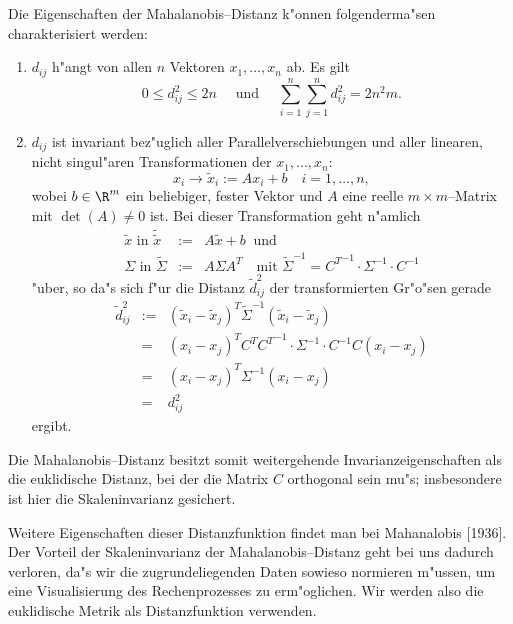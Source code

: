 Die Eigenschaften der Mahalanobis--Distanz k"onnen folgenderma"sen 
charakterisiert werden:
\begin{enumerate}
\item $d_{ij}$ h"angt von allen $n$ Vektoren $x_1,\dots,x_n$ ab. Es gilt
\[ 0 \leq d_{ij}^2 \leq 2n \quad \mbox{ und } \quad 
	\sum_{i=1}^n\sum_{j=1}^n d_{ij}^2 = 2n^2m.\]
\item $d_{ij}$ ist invariant bez"uglich aller Parallelverschiebungen
und aller linearen, nicht singul"aren Transformationen der $x_1,\dots,x_n$:
\[ x_i \to \tilde x_i := A x_i + b \quad i =1,\dots,n,\]
wobei $b \in \R^m$ ein beliebiger, fester Vektor und $A$ eine reelle
$m\times m$--Matrix mit $\det(A) \neq 0$ ist. Bei dieser
Transformation geht n"amlich
\begin{eqnarray*}
	\tilde x \mbox{ in } \tilde{\tilde x} & := & A \tilde x + b \ \mbox{ und}\\
	\Sigma   \mbox{ in } \tilde\Sigma     & := & A \Sigma A^T \quad \mbox{mit }
		\tilde\Sigma^{-1} = {C^T}^{-1} \cdot \Sigma^{-1} \cdot C^{-1}
\end{eqnarray*}
"uber, so da"s sich f"ur die Distanz $\tilde d_{ij}^2$ der transformierten
Gr"o"sen gerade
\begin{eqnarray*}
	\tilde d_{ij}^2 & := & (\tilde x_i -\tilde x_j)^T\tilde\Sigma^{-1}
		(\tilde x_i - \tilde x_j) \\
	& = & (x_i -x_j)^TC^T{C^T}^{-1}\cdot\Sigma^{-1}\cdot C^{-1}C(x_i-x_j) \\
	& = & (x_i -x_j)^T \Sigma^{-1}(x_i-x_j)\\
	& = & d^2_{ij}
\end{eqnarray*}
ergibt.
\end{enumerate}
Die Mahalanobis--Distanz besitzt somit weitergehende Invarianzeigenschaften
als die euklidische Distanz, bei der die Matrix $C$ orthogonal sein mu"s;
insbesondere ist hier die Skaleninvarianz gesichert.

Weitere Eigenschaften dieser Distanzfunktion findet man bei Mahanalobis
[1936]. 
Der Vorteil der Skaleninvarianz der Mahalanobis--Distanz geht bei uns
dadurch verloren, da"s wir die zugrundeliegenden Daten sowieso normieren
m"ussen, um eine Visualisierung des Rechenprozesses zu erm"oglichen.
Wir werden also die euklidische Metrik als Distanzfunktion verwenden.

